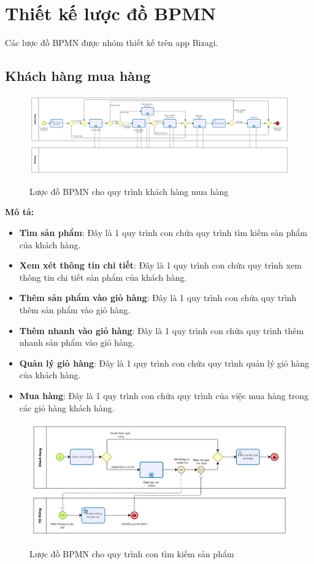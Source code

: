 \section{Thiết kế lược đồ BPMN}

Các lược đồ BPMN được nhóm thiết kế trên app Bizagi.
\subsection{Khách hàng mua hàng}
    \begin{figure}[!htp]
        \centering
        \includegraphics[width=17cm]{img/BPMN/customer_buy/customer_buy.png}
        \label{4}
        \newline
        \caption{Lược đồ BPMN cho quy trình khách hàng mua hàng}
    \end{figure}
    \textbf{Mô tả:}
    \begin{itemize}
        \item \textbf{Tìm sản phẩm}: Đây là 1 quy trình con chứa quy trình tìm kiếm sản phẩm của  khách hàng.
        \item \textbf{Xem xét thông tin chi tiết}: Đây là 1 quy trình con chứa quy trình xem thông tin chi tiết sản phẩm của  khách hàng.
        \item \textbf{Thêm sản phẩm vào giỏ hàng}: Đây là 1 quy trình con chứa quy trình thêm sản phẩm vào giỏ hàng.
        \item \textbf{Thêm nhanh vào giỏ hàng}: Đây là 1 quy trình con chứa quy trình thêm nhanh sản phẩm vào giỏ hàng.
        \item \textbf{Quản lý giỏ hàng}: Đây là 1 quy trình con chứa quy trình quản lý giỏ hàng của khách hàng.
        \item \textbf{Mua hàng}: Đây là 1 quy trình con chứa quy trình của việc mua hàng trong các giỏ hàng khách hàng.
    \end{itemize}
    \begin{figure}[!htp]
        \centering
        \includegraphics[width=13cm]{img/BPMN/customer_buy/customer_search_product.png}
        \label{4}
        \newline
        \caption{Lược đồ BPMN cho quy trình con tìm kiếm sản phẩm}
    \end{figure}
